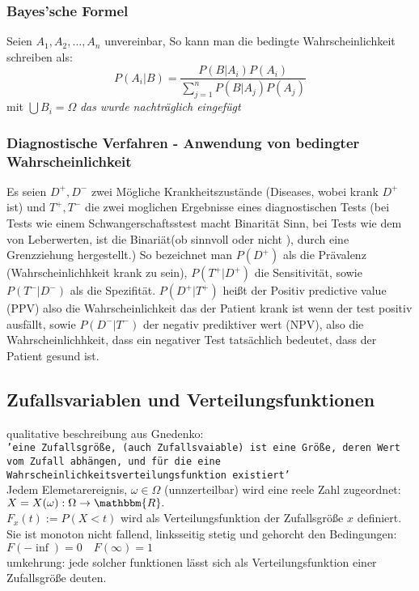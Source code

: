 \documentclass[a4paper]{article}
\theoremstyle{definition}
\theoremstyle{remark}
\begin{document}
\subsubsection{Bayes'sche Formel}
\label{ssub:bayes_sche_formel}

Seien $A_1,A_2,\dots,A_n$ unvereinbar, So kann man die bedingte Wahrscheinlichkeit schreiben als:
\begin{equation}
  P(A_i|B)=\frac{P(B|A_i)P(A_i)}{\sum_{j=1}^n P(B|A_j)P(A_j)}
\end{equation} 
mit $ \bigcup B_i=\Omega $
\textit{das wurde nachträglich eingefügt}

\subsubsection{Diagnostische Verfahren - Anwendung von bedingter Wahrscheinlichkeit}
\label{ssub:diagnostische_verfahren_anwendung_von_bedingter_wahrscheinlichkeit}

Es seien $D^+,D^-$ zwei Mögliche Krankheitszustände (Diseases, wobei krank $D^+$ ist) und $T^+,T^-$ 
die zwei moglichen Ergebnisse eines diagnostischen Tests 
(bei Tests wie einem Schwangerschaftsstest macht Binarität Sinn, bei Tests wie dem von Leberwerten, ist die Binariät(ob sinnvoll oder nicht ), durch eine Grenzziehung hergestellt.) 
So bezeichnet man $P(D^+)$ als die Prävalenz (Wahrscheinlichhkeit krank zu sein), $P(T^+|D^+)$ die Sensitivität, sowie $P(T^-|D^-)$ als die Spezifität. $P(D^+|T^+)$ heißt der Positiv predictive value (PPV) also die Wahrscheinlichkeit das der Patient krank ist wenn der test positiv ausfällt, sowie $P(D^-|T^-)$ der negativ prediktiver wert (NPV), also die Wahrscheinlichhkeit, dass ein negativer Test tatsächlich bedeutet, dass der Patient gesund ist.\\
  \subsection{Zufallsvariablen und Verteilungsfunktionen} %
\label{sub:subsection_name}


qualitative beschreibung aus Gnedenko:\\
\texttt{'eine Zufallsgröße, (auch Zufallsvaiable) ist eine Größe, deren Wert vom Zufall abhängen, und für die eine Wahrscheinlichkeitsverteilungsfunktion existiert'\\}
Jedem Elemetarereignis, $\omega \in \Omega $ (unnzerteilbar) wird eine reele Zahl zugeordnet:\\
$X=X(\omega ):\Omega  \rightarrow \mathbbm{R}.$\\
$F_x(t):= P(X<t)$ wird als Verteilungsfunktion der Zufallsgröße $x$ definiert. Sie ist monoton nicht fallend, linksseitig stetig und gehorcht den Bedingungen: $F(-\inf)=0\quad F(\infty)=1$
\\
umkehrung: jede solcher funktionen lässt sich als Verteilungsfunktion einer Zufallsgröße deuten.
\end{document}
